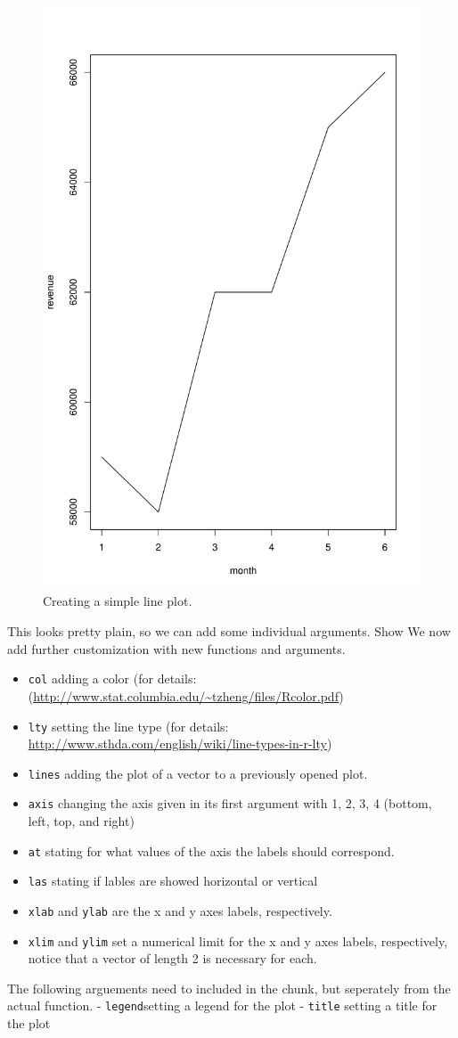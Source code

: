 \documentclass[]{report}
\providecommand{\tightlist}{%
  \setlength{\itemsep}{0pt}\setlength{\parskip}{0pt}}
\begin{document}
\begin{figure}

{\centering \includegraphics[width=0.25\linewidth]{MyBook_files/figure-latex/simple-plots-1-1} 

}

\caption{Creating a simple line plot.}\label{fig:simple-plots-1}
\end{figure}

This looks pretty plain, so we can add some individual arguments. Show
We now add further customization with new functions and arguments.

\begin{itemize}
\tightlist
\item
  \texttt{col} adding a color (for
  details:(\url{http://www.stat.columbia.edu/~tzheng/files/Rcolor.pdf})
\item
  \texttt{lty} setting the line type (for details:
  \url{http://www.sthda.com/english/wiki/line-types-in-r-lty})
\item
  \texttt{lines} adding the plot of a vector to a previously opened
  plot.
\item
  \texttt{axis} changing the axis given in its first argument with 1, 2,
  3, 4 (bottom, left, top, and right)
\item
  \texttt{at} stating for what values of the axis the labels should
  correspond.
\item
  \texttt{las} stating if lables are showed horizontal or vertical
\item
  \texttt{xlab} and \texttt{ylab} are the x and y axes labels,
  respectively.
\item
  \texttt{xlim} and \texttt{ylim} set a numerical limit for the x and y
  axes labels, respectively, notice that a vector of length 2 is
  necessary for each.
\end{itemize}

The following arguements need to included in the chunk, but seperately
from the actual function. - \texttt{legend}setting a legend for the plot
- \texttt{title} setting a title for the plot
\end{document}
